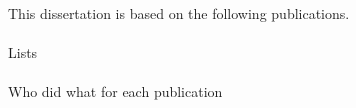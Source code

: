 \begin{publications}
\noindent
This dissertation is based on the following publications.
\\\\
Lists
\\\\
Who did what for each publication

\end{publications}
\clearpage